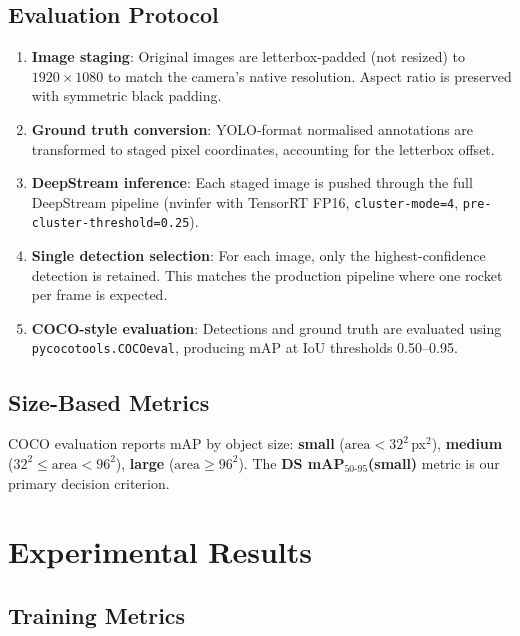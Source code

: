 \documentclass[12pt, titlepage]{article}
\begin{document}
\subsection{Evaluation Protocol}

\begin{enumerate}[leftmargin=*]
  \item \textbf{Image staging}: Original images are letterbox-padded
        (not resized) to $1920{\times}1080$ to match the camera's native
        resolution.  Aspect ratio is preserved with symmetric black
        padding.
  \item \textbf{Ground truth conversion}: YOLO-format normalised
        annotations are transformed to staged pixel coordinates,
        accounting for the letterbox offset.
  \item \textbf{DeepStream inference}: Each staged image is pushed through
        the full DeepStream pipeline (nvinfer with TensorRT FP16,
        \texttt{cluster-mode=4}, \texttt{pre-cluster-threshold=0.25}).
  \item \textbf{Single detection selection}: For each image, only the
        highest-confidence detection is retained.  This matches the
        production pipeline where one rocket per frame is expected.
  \item \textbf{COCO-style evaluation}: Detections and ground truth are
        evaluated using \texttt{pycocotools.COCOeval}, producing mAP at
        IoU thresholds 0.50--0.95.
\end{enumerate}

\subsection{Size-Based Metrics}

COCO evaluation reports mAP by object size: \textbf{small} ($\text{area} <
32^2$\,px$^2$), \textbf{medium} ($32^2 \leq \text{area} < 96^2$),
\textbf{large} ($\text{area} \geq 96^2$). The \textbf{DS
  mAP$_{50\text{-}95}$(small)} metric is our primary decision criterion.

\section{Experimental Results}
\label{sec:results}

\subsection{Training Metrics}
\end{document}
